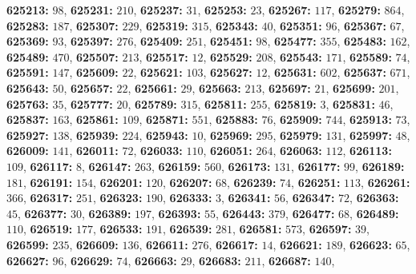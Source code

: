 \textsf{\bfseries 625213:} $98$, \textsf{\bfseries 625231:} $210$, \textsf{\bfseries 625237:} $31$, \textsf{\bfseries 625253:} $23$, \textsf{\bfseries 625267:} $117$, \textsf{\bfseries 625279:} $864$, \textsf{\bfseries 625283:} $187$, \textsf{\bfseries 625307:} $229$, \textsf{\bfseries 625319:} $315$, \textsf{\bfseries 625343:} $40$, \textsf{\bfseries 625351:} $96$, \textsf{\bfseries 625367:} $67$, \textsf{\bfseries 625369:} $93$, \textsf{\bfseries 625397:} $276$, \textsf{\bfseries 625409:} $251$, \textsf{\bfseries 625451:} $98$, \textsf{\bfseries 625477:} $355$, \textsf{\bfseries 625483:} $162$, \textsf{\bfseries 625489:} $470$, \textsf{\bfseries 625507:} $213$, \textsf{\bfseries 625517:} $12$, \textsf{\bfseries 625529:} $208$, \textsf{\bfseries 625543:} $171$, \textsf{\bfseries 625589:} $74$, \textsf{\bfseries 625591:} $147$, \textsf{\bfseries 625609:} $22$, \textsf{\bfseries 625621:} $103$, \textsf{\bfseries 625627:} $12$, \textsf{\bfseries 625631:} $602$, \textsf{\bfseries 625637:} $671$, \textsf{\bfseries 625643:} $50$, \textsf{\bfseries 625657:} $22$, \textsf{\bfseries 625661:} $29$, \textsf{\bfseries 625663:} $213$, \textsf{\bfseries 625697:} $21$, \textsf{\bfseries 625699:} $201$, \textsf{\bfseries 625763:} $35$, \textsf{\bfseries 625777:} $20$, \textsf{\bfseries 625789:} $315$, \textsf{\bfseries 625811:} $255$, \textsf{\bfseries 625819:} $3$, \textsf{\bfseries 625831:} $46$, \textsf{\bfseries 625837:} $163$, \textsf{\bfseries 625861:} $109$, \textsf{\bfseries 625871:} $551$, \textsf{\bfseries 625883:} $76$, \textsf{\bfseries 625909:} $744$, \textsf{\bfseries 625913:} $73$, \textsf{\bfseries 625927:} $138$, \textsf{\bfseries 625939:} $224$, \textsf{\bfseries 625943:} $10$, \textsf{\bfseries 625969:} $295$, \textsf{\bfseries 625979:} $131$, \textsf{\bfseries 625997:} $48$, \textsf{\bfseries 626009:} $141$, \textsf{\bfseries 626011:} $72$, \textsf{\bfseries 626033:} $110$, \textsf{\bfseries 626051:} $264$, \textsf{\bfseries 626063:} $112$, \textsf{\bfseries 626113:} $109$, \textsf{\bfseries 626117:} $8$, \textsf{\bfseries 626147:} $263$, \textsf{\bfseries 626159:} $560$, \textsf{\bfseries 626173:} $131$, \textsf{\bfseries 626177:} $99$, \textsf{\bfseries 626189:} $181$, \textsf{\bfseries 626191:} $154$, \textsf{\bfseries 626201:} $120$, \textsf{\bfseries 626207:} $68$, \textsf{\bfseries 626239:} $74$, \textsf{\bfseries 626251:} $113$, \textsf{\bfseries 626261:} $366$, \textsf{\bfseries 626317:} $251$, \textsf{\bfseries 626323:} $190$, \textsf{\bfseries 626333:} $3$, \textsf{\bfseries 626341:} $56$, \textsf{\bfseries 626347:} $72$, \textsf{\bfseries 626363:} $45$, \textsf{\bfseries 626377:} $30$, \textsf{\bfseries 626389:} $197$, \textsf{\bfseries 626393:} $55$, \textsf{\bfseries 626443:} $379$, \textsf{\bfseries 626477:} $68$, \textsf{\bfseries 626489:} $110$, \textsf{\bfseries 626519:} $177$, \textsf{\bfseries 626533:} $191$, \textsf{\bfseries 626539:} $281$, \textsf{\bfseries 626581:} $573$, \textsf{\bfseries 626597:} $39$, \textsf{\bfseries 626599:} $235$, \textsf{\bfseries 626609:} $136$, \textsf{\bfseries 626611:} $276$, \textsf{\bfseries 626617:} $14$, \textsf{\bfseries 626621:} $189$, \textsf{\bfseries 626623:} $65$, \textsf{\bfseries 626627:} $96$, \textsf{\bfseries 626629:} $74$, \textsf{\bfseries 626663:} $29$, \textsf{\bfseries 626683:} $211$, \textsf{\bfseries 626687:} $140$, 
